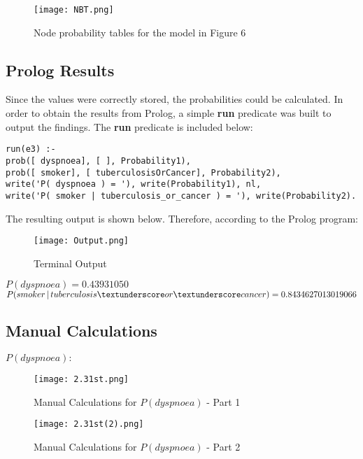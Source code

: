 \documentclass[11pt]{article}
\newcommand{\forceindent}{\leavevmode{\parindent=1em\indent}}
\begin{document}
\begin{figure}[h!]
  \centering
{\texttt{[image: NBT.png]}}
    \caption{Node probability tables for the model in Figure 6}
\end{figure}

\subsection{Prolog Results}
\forceindent Since the values were correctly stored, the probabilities could be calculated. In order to obtain the results from Prolog, a simple \textbf{run} predicate was built to output the findings. The \textbf{run} predicate is included below: 


\begin{lstlisting}
run(e3) :-
prob([ dyspnoea], [ ], Probability1),
prob([ smoker], [ tuberculosisOrCancer], Probability2),
write('P( dyspnoea ) = '), write(Probability1), nl,
write('P( smoker | tuberculosis_or_cancer ) = '), write(Probability2).
\end{lstlisting}
\vspace{0.5cm}
The resulting output is shown below. Therefore, according to the Prolog program:\\
\begin{figure}[h!]
  \centering
{\texttt{[image: Output.png]}}
    \caption{Terminal Output}
\end{figure}
\vspace{0.5cm}

$P(dyspnoea) = 0.43931050$ \\
$P(smoker\,|\,tuberculosis \textunderscore or \textunderscore cancer) = 0.8434627013019066$\\

\subsection{Manual Calculations}

$P(dyspnoea):$ \\

\begin{figure}[h!]
  \centering
{\texttt{[image: 2.31st.png]}}
    \caption{Manual Calculations for $P(dyspnoea)$ - Part 1 }
\end{figure} 


\begin{figure}[h!]
  \centering
{\texttt{[image: 2.31st(2).png]}}
    \caption{Manual Calculations for $P(dyspnoea)$ - Part 2 }
\end{figure} 
 
\end{document}
